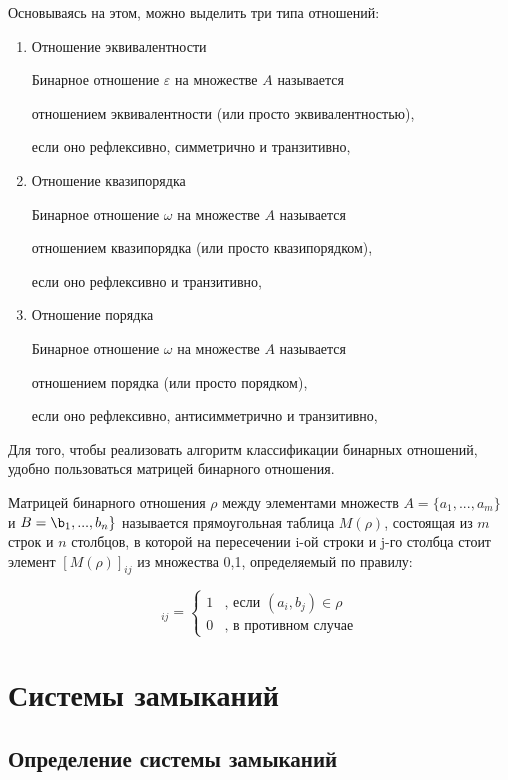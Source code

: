 \documentclass[bachelor, och, labwork]{shiza}
\begin{document}
	Основываясь на этом, можно выделить три типа отношений:
	
	\begin{enumerate}
		\item Отношение эквивалентности
		
		Бинарное отношение $\varepsilon $ на множестве $A$ называется 
		
		$\textit{отношением эквивалентности}$ (или просто $\textit{эквивалентностью}$),
		
		если оно рефлексивно, симметрично и транзитивно,
		\item Отношение квазипорядка
		
		Бинарное отношение $\omega $ на множестве $A$ называется 
		
		$\textit{отношением квазипорядка}$ (или просто $\textit{квазипорядком}$),
		
		 если оно рефлексивно и транзитивно,
		\item Отношение порядка
		
		Бинарное отношение $\omega $ на множестве $A$ называется 
		
		$\textit{отношением порядка}$ (или просто $\textit{порядком}$),
		
		 если оно рефлексивно, антисимметрично и транзитивно,
	\end{enumerate}
		
	Для того, чтобы реализовать алгоритм классификации бинарных отношений, удобно пользоваться матрицей бинарного отношения.
	
	$\textit{Матрицей}$ бинарного отношения $\rho$ между элементами множеств $A = \{a_1, ..., a_m\}$ и $B = \b_1, ..., b_n\}$ называется прямоугольная таблица $M(\rho)$, состоящая из $m$ строк и $n$ столбцов, в которой на пересечении i-ой строки и j-го столбца стоит элемент $[M(\rho)]_{ij}$ из множества {0,1}, определяемый по правилу:
	
	\begin{equation*}
		[M(\rho)]_{ij} =  
		\begin{cases}
			1 &\text{, если $(a_i, b_j) \in \rho$}\\
			0 &\text{, в противном случае}
		\end{cases}
	\end{equation*}


		\section{Системы замыканий}
	\subsection{Определение системы замыканий}
	
\end{document}
